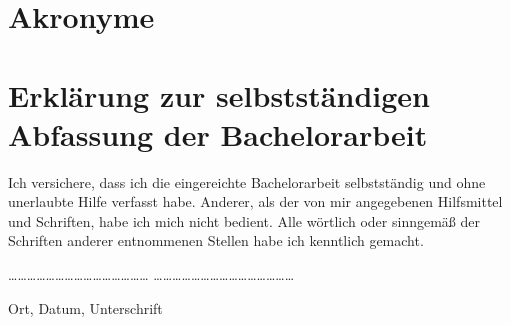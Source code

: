 \documentclass[11pt,a4paper]{article}
\begin{document}
\section*{Akronyme}
\begin{acronym}[Bash]
\end{acronym}
\clearpage


\clearpage
\section*{Erklärung zur selbstständigen Abfassung der Bachelorarbeit}
Ich versichere, dass ich die eingereichte Bachelorarbeit selbstständig und ohne 
unerlaubte Hilfe verfasst habe. Anderer, als der von mir angegebenen 
Hilfsmittel und Schriften, habe ich mich nicht bedient. Alle wörtlich oder 
sinngemäß der Schriften anderer entnommenen Stellen habe ich kenntlich gemacht.

\vspace{8em}

\dots\dots\dots\dots\dots\dots\dots\dots\dots\dots\dots\dots\dots\dots\dots
\dots\dots\dots\dots\dots\dots\dots\dots\dots\dots\dots\dots\dots\dots\dots

Ort, Datum, Unterschrift
\end{document}
